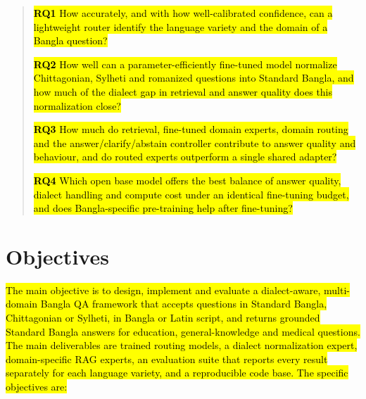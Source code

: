\begin{quote}
\hl{\textbf{RQ1} How accurately, and with how well-calibrated
confidence, can a lightweight router identify the language variety and
the domain of a Bangla question?}

\hl{\textbf{RQ2} How well can a parameter-efficiently fine-tuned model
normalize Chittagonian, Sylheti and romanized questions into Standard
Bangla, and how much of the dialect gap in retrieval and answer quality
does this normalization close?}

\hl{\textbf{RQ3} How much do retrieval, fine-tuned domain experts,
domain routing and the answer/clarify/abstain controller contribute to
answer quality and behaviour, and do routed experts outperform a single
shared adapter?}

\hl{\textbf{RQ4} Which open base model offers the best balance of answer
quality, dialect handling and compute cost under an identical
fine-tuning budget, and does Bangla-specific pre-training help after
fine-tuning?}
\end{quote}

\section{Objectives}\label{objectives}

\hl{The main objective is to design, implement and evaluate a
dialect-aware, multi-domain Bangla QA framework that accepts questions
in Standard Bangla, Chittagonian or Sylheti, in Bangla or Latin script,
and returns grounded Standard Bangla answers for education,
general-knowledge and medical questions. The main deliverables are
trained routing models, a dialect normalization expert, domain-specific
RAG experts, an evaluation suite that reports every result separately
for each language variety, and a reproducible code base. The specific
objectives are:}

